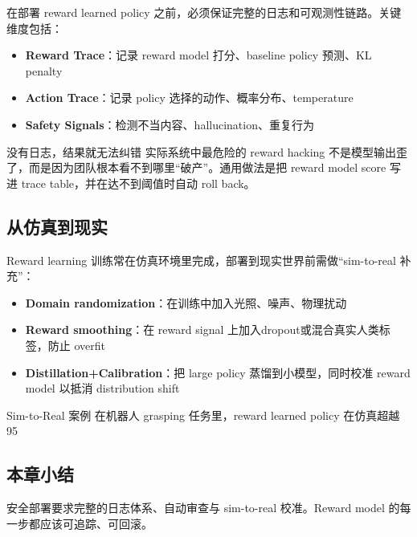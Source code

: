 \documentclass[a4paper]{article}
\begin{document}
在部署 reward learned policy 之前，必须保证完整的日志和可观测性链路。关键维度包括：

\begin{itemize}
    \item \textbf{Reward Trace}：记录 reward model 打分、baseline policy 预测、KL penalty
    \item \textbf{Action Trace}：记录 policy 选择的动作、概率分布、temperature
    \item \textbf{Safety Signals}：检测不当内容、hallucination、重复行为
\end{itemize}

\begin{warningbox}{没有日志，结果就无法纠错}
实际系统中最危险的 reward hacking 不是模型输出歪了，而是因为团队根本看不到哪里“破产”。通用做法是把 reward model score 写进 trace table，并在达不到阈值时自动 roll back。
\end{warningbox}

\subsection{从仿真到现实}

Reward learning 训练常在仿真环境里完成，部署到现实世界前需做“sim-to-real 补充”：

\begin{itemize}
    \item \textbf{Domain randomization}：在训练中加入光照、噪声、物理扰动
    \item \textbf{Reward smoothing}：在 reward signal 上加入dropout或混合真实人类标签，防止 overfit
    \item \textbf{Distillation+Calibration}：把 large policy 蒸馏到小模型，同时校准 reward model 以抵消 distribution shift
\end{itemize}

\begin{knowledgebox}{Sim-to-Real 案例}
在机器人 grasping 任务里，reward learned policy 在仿真超越 95%
\end{knowledgebox}

\subsection{本章小结}

安全部署要求完整的日志体系、自动审查与 sim-to-real 校准。Reward model 的每一步都应该可追踪、可回滚。
\end{document}
